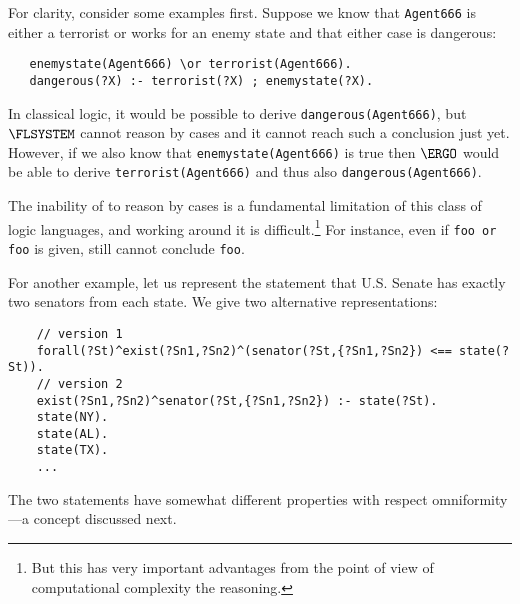 For clarity, consider some examples first. Suppose we know that
\texttt{Agent666} is either a terrorist or works for an enemy state and
that either case is dangerous:
\begin{verbatim}
   enemystate(Agent666) \or terrorist(Agent666).
   dangerous(?X) :- terrorist(?X) ; enemystate(?X).
\end{verbatim}
In classical logic, it would be possible to derive \texttt{dangerous(Agent666)},
but $\FLSYSTEM$ cannot reason by cases and it cannot reach such a
conclusion just yet.
However, if we also know that \texttt{\RULELOGNEG enemystate(Agent666)}  is
true then
$\ERGO$ would be able to derive \texttt{terrorist(Agent666)} and thus
also \texttt{dangerous(Agent666)}.

The inability of \ERGO to reason by cases is a fundamental limitation
of this class of logic languages, and
working around it is difficult.\footnote{
  But this has very important advantages from the point of view of
  computational complexity the reasoning.
}
For instance, even if \texttt{foo \bs{}or
  foo} is given, \ERGO still cannot conclude \texttt{foo}. 


For another example, let us represent the statement that U.S. Senate has exactly
two senators from each state. We give two alternative representations:
\begin{verbatim}
    // version 1
    forall(?St)^exist(?Sn1,?Sn2)^(senator(?St,{?Sn1,?Sn2}) <== state(?St)).
    // version 2
    exist(?Sn1,?Sn2)^senator(?St,{?Sn1,?Sn2}) :- state(?St).
    state(NY).
    state(AL).
    state(TX).
    ...
\end{verbatim}
The two statements have somewhat different properties with respect
omniformity---a concept discussed next.


